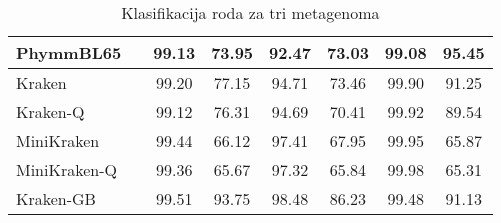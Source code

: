 \documentclass[times, utf8, zavrsni]{fer}
\begin{document}
{\begin{table}[htb]
{\begin{tabular}{|llcccccc|}
			PhymmBL65             & \multicolumn{1}{l|}{} & \multicolumn{1}{c|}{99.13}    & \multicolumn{1}{c|}{73.95}      & \multicolumn{1}{c|}{92.47}    & \multicolumn{1}{c|}{73.03}      & \multicolumn{1}{c|}{99.08}    & 95.45                            \\ \hline
			Kraken                & \multicolumn{1}{l|}{} & \multicolumn{1}{c|}{99.20}    & \multicolumn{1}{c|}{77.15}      & \multicolumn{1}{c|}{94.71}    & \multicolumn{1}{c|}{73.46}      & \multicolumn{1}{c|}{99.90}    & 91.25                            \\ \hline
			Kraken-Q              & \multicolumn{1}{l|}{} & \multicolumn{1}{c|}{99.12}    & \multicolumn{1}{c|}{76.31}      & \multicolumn{1}{c|}{94.69}    & \multicolumn{1}{c|}{70.41}      & \multicolumn{1}{c|}{99.92}    & 89.54                            \\ \hline
			MiniKraken            & \multicolumn{1}{l|}{} & \multicolumn{1}{c|}{99.44}    & \multicolumn{1}{c|}{66.12}      & \multicolumn{1}{c|}{97.41}    & \multicolumn{1}{c|}{67.95}      & \multicolumn{1}{c|}{99.95}    & 65.87                            \\ \hline
			MiniKraken-Q          & \multicolumn{1}{l|}{} & \multicolumn{1}{c|}{99.36}    & \multicolumn{1}{c|}{65.67}      & \multicolumn{1}{c|}{97.32}    & \multicolumn{1}{c|}{65.84}      & \multicolumn{1}{c|}{99.98}    & 65.31                            \\ \hline
			Kraken-GB             & \multicolumn{1}{l|}{} & \multicolumn{1}{c|}{99.51}    & \multicolumn{1}{c|}{93.75}      & \multicolumn{1}{c|}{98.48}    & \multicolumn{1}{c|}{86.23}      & \multicolumn{1}{c|}{99.48}    & 91.13                            \\ \hline
		\end{tabular}%
	}
	\caption{Klasifikacija roda za tri metagenoma}
	\label{StatRez}
\end{table}


}
\end{document}
